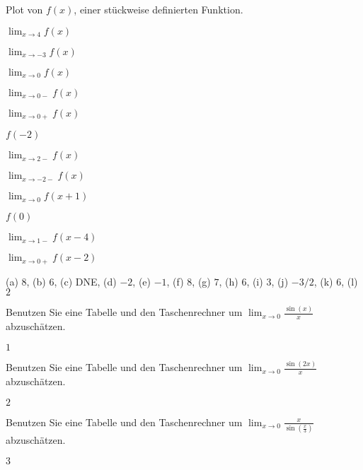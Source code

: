 \begin{exercises}
\begin{exercise}
\begin{marginfigure}
\caption{Plot von $f(x)$, einer stückweise definierten Funktion.}
\label{plot:piecewise-exercise}
\end{marginfigure}
\begin{enumerate}
\begin{multicols}{3}
\item $\lim_{x\to 4} f(x)$  
\item $\lim_{x\to -3} f(x)$  
\item $\lim_{x\to 0} f(x)$ 
\item $\lim_{x\to 0-} f(x)$  
\item $\lim_{x\to 0+} f(x)$  
\item $f(-2)$  
\item $\lim_{x\to 2-} f(x)$  
\item $\lim_{x\to -2-} f(x)$  
\item $\lim_{x\to 0} f(x+1)$  
\item $f(0)$ 
\item $\lim_{x\to 1-} f(x-4)$  
\item $\lim_{x\to 0+} f(x-2)$
\end{multicols}  
\end{enumerate}
\begin{answer}
 (a) $8$, (b) $6$, (c) DNE,
 (d) $-2$, (e) $-1$, (f) $8$,
 (g) $7$, (h) $6$, (i) $3$,
 (j) $-3/2$, (k) $6$, (l) $2$
\end{answer}
\end{exercise}


\begin{exercise} 
Benutzen Sie eine Tabelle und den Taschenrechner um  $\lim_{x\to 0} 
\frac{\sin(x)}{x}$ abzuschätzen.
\begin{answer}
  $1$
\end{answer}
\end{exercise}

\begin{exercise} 
Benutzen Sie eine Tabelle und den Taschenrechner um  $\lim_{x\to 0} \frac{\sin(2x)}{x}$ abzuschätzen.
\begin{answer}
  $2$
\end{answer}
\end{exercise}

\begin{exercise} 
Benutzen Sie eine Tabelle und den Taschenrechner um $\lim_{x\to 0} \frac{x}{\sin\left(\frac{x}{3}\right)}$ abzuschätzen.
\begin{answer}
  $3$
\end{answer}
\end{exercise}


\end{exercises}
